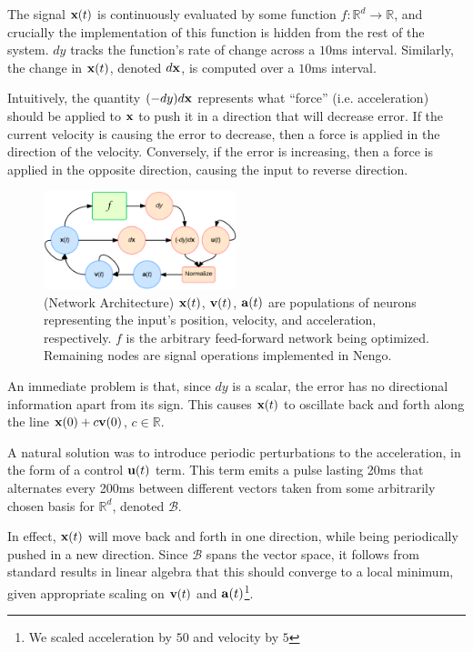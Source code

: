 \documentclass[letterpaper, 10 pt, conference]{ieeeconf}  %
\newcommand{\bolds}[1]{{\bf #1}}
\begin{document}
The signal $\bolds{x}(t)$ is continuously evaluated by some function $f : \mathbb{R}^d \rightarrow \mathbb{R}$, and crucially the implementation of this function is hidden from the rest of the system. $dy$ tracks the function's rate of change across a $10$ms interval. Similarly, the change in $\bolds{x}(t)$, denoted $d\bolds{x}$, is computed over a $10$ms interval. 

Intuitively, the quantity $(-dy)d\bolds{x}$ represents what ``force'' (i.e. acceleration) should be applied to $\bolds{x}$ to push it in a direction that will decrease error. If the current velocity is causing the error to decrease, then a force is applied in the direction of the velocity. Conversely, if the error is increasing, then a force is applied in the opposite direction, causing the input to reverse direction.

\begin{figure}[ht]
  \centering
  \includegraphics[width=0.5\textwidth]{hill_network.png}
  \caption{(Network Architecture) $\bolds{x}(t)$, $\bolds{v}(t)$, $\bolds{a}(t)$ are populations of neurons representing the input's position, velocity, and acceleration, respectively. $f$ is the arbitrary feed-forward network being optimized. Remaining nodes are signal operations implemented in Nengo.}
\end{figure}

An immediate problem is that, since $dy$ is a scalar, the error has no directional information apart from its sign. This causes $\bolds{x}(t)$ to oscillate back and forth along the line $\bolds{x}(0) + c \bolds{v}(0)$, $c \in \mathbb{R}$. 

A natural solution was to introduce periodic perturbations to the acceleration, in the form of a control $\bolds{u}(t)$ term. This term emits a pulse lasting 20ms that alternates every 200ms between different vectors taken from some arbitrarily chosen basis for $\mathbb{R}^d$, denoted $\mathcal{B}$.

In effect, $\bolds{x}(t)$ will move back and forth in one direction, while being periodically pushed in a new direction. Since $\mathcal{B}$ spans the vector space, it follows from standard results in linear algebra that this should converge to a local minimum, given appropriate scaling on $\bolds{v}(t)$ and $\bolds{a}(t)$\footnote{We scaled acceleration by $50$ and velocity by $5$}.
\end{document}
